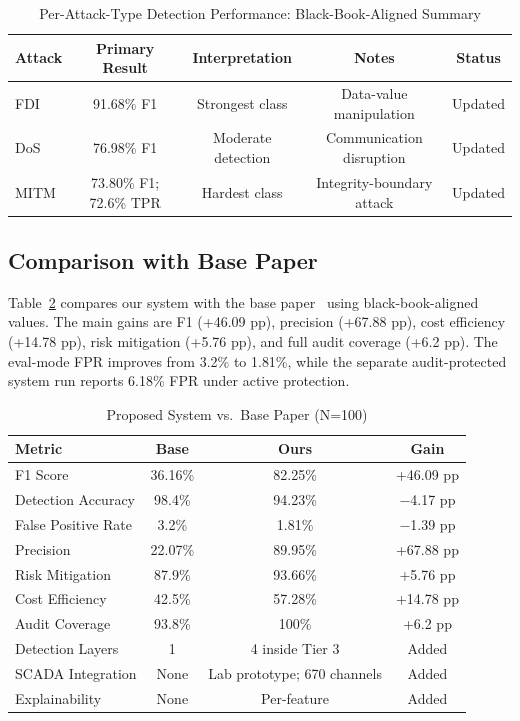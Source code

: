\documentclass[conference,a4paper]{IEEEtran}
\begin{document}
\begin{table}[htbp]
\caption{Per-Attack-Type Detection Performance: Black-Book-Aligned Summary}
\begin{center}
\begin{tabular}{|l|c|c|c|c|}
\hline
\textbf{Attack} & \textbf{Primary Result} & \textbf{Interpretation} & \textbf{Notes} & \textbf{Status} \\
\hline
FDI & 91.68\% F1 & Strongest class & Data-value manipulation & Updated \\
\hline
DoS & 76.98\% F1 & Moderate detection & Communication disruption & Updated \\
\hline
MITM & 73.80\% F1; 72.6\% TPR & Hardest class & Integrity-boundary attack & Updated \\
\hline
\end{tabular}
\label{tab:attacktype}
\end{center}
\end{table}

\subsection{Comparison with Base Paper}

Table~\ref{tab:base} compares our system with the base paper~\cite{b17} using black-book-aligned values. The main gains are F1 (+46.09 pp), precision (+67.88 pp), cost efficiency (+14.78 pp), risk mitigation (+5.76 pp), and full audit coverage (+6.2 pp). The eval-mode FPR improves from 3.2\% to 1.81\%, while the separate audit-protected system run reports 6.18\% FPR under active protection.

\begin{table}[htbp]
\caption{Proposed System vs.\ Base Paper (N=100)}
\begin{center}
\begin{tabular}{|l|c|c|c|}
\hline
\textbf{Metric} & \textbf{Base} & \textbf{Ours} & \textbf{Gain} \\
\hline
F1 Score & 36.16\% & 82.25\% & +46.09 pp \\
\hline
Detection Accuracy & 98.4\% & 94.23\% & $-$4.17 pp \\
\hline
False Positive Rate & 3.2\% & 1.81\% & $-$1.39 pp \\
\hline
Precision & 22.07\% & 89.95\% & +67.88 pp \\
\hline
Risk Mitigation & 87.9\% & 93.66\% & +5.76 pp \\
\hline
Cost Efficiency & 42.5\% & 57.28\% & +14.78 pp \\
\hline
Audit Coverage & 93.8\% & 100\% & +6.2 pp \\
\hline
Detection Layers & 1 & 4 inside Tier 3 & Added \\
\hline
SCADA Integration & None & Lab prototype; 670 channels & Added \\
\hline
Explainability & None & Per-feature & Added \\
\hline
\end{tabular}
\label{tab:base}
\end{center}
\end{table}
\end{document}
